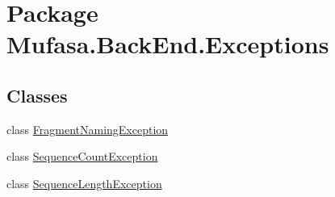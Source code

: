 \hypertarget{namespace_mufasa_1_1_back_end_1_1_exceptions}{\section{Package Mufasa.\+Back\+End.\+Exceptions}
\label{namespace_mufasa_1_1_back_end_1_1_exceptions}
}
\subsection*{Classes}
\begin{DoxyCompactItemize}
\item 
class \hyperlink{class_mufasa_1_1_back_end_1_1_exceptions_1_1_fragment_naming_exception}{Fragment\+Naming\+Exception}
\item 
class \hyperlink{class_mufasa_1_1_back_end_1_1_exceptions_1_1_sequence_count_exception}{Sequence\+Count\+Exception}
\item 
class \hyperlink{class_mufasa_1_1_back_end_1_1_exceptions_1_1_sequence_length_exception}{Sequence\+Length\+Exception}
\end{DoxyCompactItemize}
